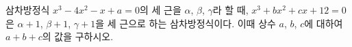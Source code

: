 삼차방정식 $x^3-4x^2-x+a=0$의 세 근을 $\alpha$, $\beta$, $\gamma$라 할 때, $x^3+bx^2+cx+12=0$은 $\alpha+1$, $\beta+1$, $\gamma+1$을 세 근으로 하는 삼차방정식이다. 이때 상수 $a$, $b$, $c$에 대하여 $a+b+c$의 값을 구하시오.
